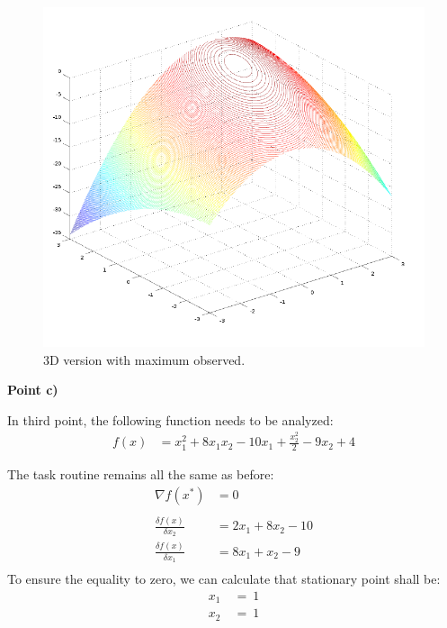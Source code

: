 \documentclass[eng,openany]{mgr}
\begin{document}
\begin{figure}
\centering
\includegraphics[width=0.7\linewidth]{screenshot009}
\caption{3D version with maximum observed.}
\label{fig:screenshot009}
\end{figure}


\clearpage
\textbf{Point c)}

In third point, the following function needs to be analyzed:
\begin{align*}
f(x) &= x_{1}^{2} + 8 x_{1} x_{2} - 10 x_{1} + \frac{x_{2}^{2}}{2} - 9 x_{2} + 4
\end{align*}

The task routine remains all the same as before:
\begin{align*}
\nabla f(x^*) &= 0\\ \\
\frac{\delta f(x)}{\delta x_2} &= 2 x_{1} + 8 x_{2} - 10
\\
\frac{\delta f(x)}{\delta x_1} &= 8 x_{1} + x_{2} - 9
\\
\end{align*}
To ensure the equality to zero, we can calculate that stationary point shall be:
\begin{align*}
x_1\ &=\ 1\\
x_2\ &=\ 1
\end{align*}
\end{document}
